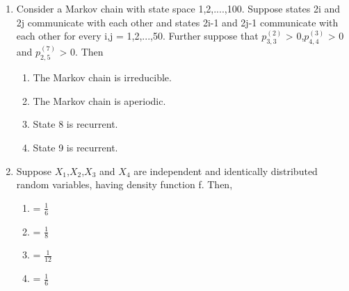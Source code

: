 \begin{enumerate}[label=\thesection.\arabic*.,ref=\thesection.\theenumi]
\item Consider a Markov chain with state space {1,2,....,100}. Suppose states 2i and 2j communicate with each other and states 2i-1 and 2j-1 communicate with each other for every i,j = 1,2,...,50. Further suppose that $p^{(2)}_{3,3}$ > 0,$p^{(3)}_{4,4}$ > 0 and $p^{(7)}_{2,5}$ > 0. Then 
\begin{enumerate}
\item The Markov chain is irreducible.
\item The Markov chain is aperiodic.
\item State 8 is recurrent.
\item State 9 is recurrent.
\end{enumerate}
\solution

%
\item Suppose $X_1$,$X_2$,$X_3$ and $X_4$ are independent and identically distributed random variables, having density function f. Then,
\begin{enumerate}
\item {} = $\frac{1}{6}$
\item {} = $\frac{1}{8}$
\item {} = $\frac{1}{12}$
\item {} = $\frac{1}{6}$
\end{enumerate}
%
\solution


\end{enumerate}
